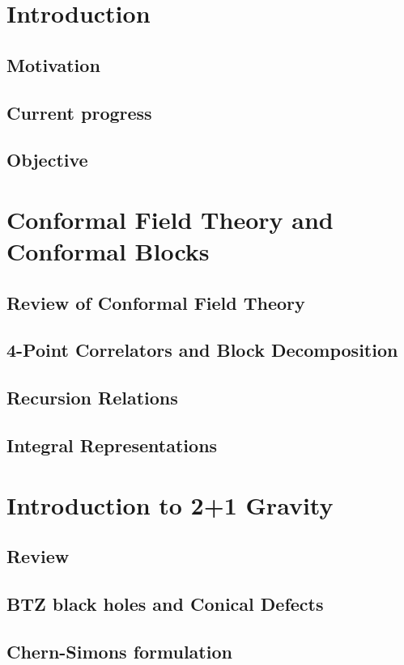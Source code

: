 \documentclass[a4paper,10pt]{article}
\begin{document}
\tableofcontents
  \section{Introduction}
  \subsection{Motivation}
  \subsection{Current progress}
  \subsection{Objective}
  \section{Conformal Field Theory and Conformal Blocks}
  \subsection{Review of Conformal Field Theory}
  \subsection{4-Point Correlators and Block Decomposition}
  \subsection{Recursion Relations}
  \subsection{Integral Representations}
  \section{Introduction to 2+1 Gravity}
  \subsection{Review}
  \subsection{BTZ black holes and Conical Defects}
  \subsection{Chern-Simons formulation}
\end{document}
